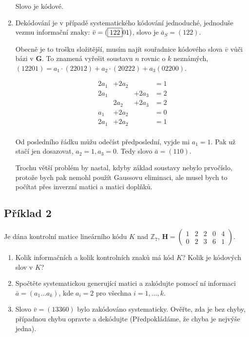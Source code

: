 \documentclass{article}
\begin{document}
\begin{enumerate}
	Slovo je kódové.
	
	\item Dekódování je v případě systematického kódování jednoduché, jednoduše vezmu informační znaky: $\bar{v}=(\framebox{122}01)$, slovo je $\bar{a}_S = (122)$.
	
	Obecně je to trošku složitější, musím najít souřadnice kódového slova $\bar{v}$ vůči bázi v $\mathbf{G}$. To znamená vyřešit soustavu $n$ rovnic o $k$ neznámých, $(12201) = a_1\cdot(22012) + a_2\cdot(20222) + a_3(02200)$.
	
	\[\begin{matrix}
  2a_1 & +2a_2 	&  			& = 1\\
  2a_1 &  			& +2a_3 & = 2\\
   		 & 2a_2 	& +2a_3 & = 2\\
  a_1  & +2a_2 	& 			& = 0\\
  2a_1 & +2a_2 	& 			& = 1\\
  \end{matrix}\]

Od posledního řádku můžu odečíst předposlední, vyjde mi $a_1 = 1$. Pak už stačí jen dosazovat, $a_2 = 1, a_3 = 0$. Tedy slovo $\bar{a} = (110)$.

Trochu větší problém by nastal, kdyby základ soustavy nebylo prvočíslo, protože bych pak nemohl použít Gaussovu eliminaci, ale musel bych to počítat přes inverzní matici a matici doplňků.
	
\end{enumerate}

\subsection{\label{priklad3-2}Příklad 2}
Je dána kontrolní matice lineárního kódu $K$ nad $\mathbb{Z}_7$, $\mathbf{H} = 
\begin{pmatrix}
  1 & 2 & 2 & 0 & 4 \\
  0 & 2 & 3 & 6 & 1
\end{pmatrix}$.

\begin{enumerate}
	\item Kolik informačních a kolik kontrolních znaků má kód $K$? Kolik je kódových slov v $K$?
	\item Spočtěte systematickou generující matici a zakódujte pomocí ní informaci $\bar{a} = (a_1 \ldots a_k)$, kde $a_i = 2$ pro všechna $i = 1,\ldots ,k$.
	\item Slovo $\bar{v} = (13360)$ bylo zakódováno systematicky. Ověřte, zda je bez chyby, případnou chybu opravte a dekódujte (Předpokládáme, že chyba je nejvýše jedna).
\end{enumerate}
\end{document}
